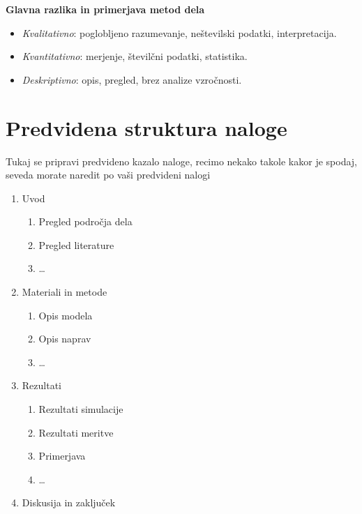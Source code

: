 \documentclass[pomnav,SMER=splošna]{fppdisp}
\begin{document}
\textbf{Glavna razlika in primerjava metod dela}
\begin{itemize}
	\item \textit{Kvalitativno}: poglobljeno razumevanje, neštevilski podatki, interpretacija.
	\item \textit{Kvantitativno}: merjenje, številčni podatki, statistika.
	\item \textit{Deskriptivno}: opis, pregled, brez analize vzročnosti.
\end{itemize}


\newpage
\section{Predvidena struktura naloge}

Tukaj se pripravi predvideno kazalo naloge, recimo nekako takole kakor je spodaj, seveda morate naredit po vaši predvideni nalogi

\begin{enumerate}
	\item Uvod
	\begin{enumerate}[label*=\arabic*.]
		\item Pregled področja dela
		\item Pregled literature
		\item \dots
	\end{enumerate}
	\item Materiali in metode
		\begin{enumerate}[label*=\arabic*.]
			\item Opis modela
			\item Opis naprav
			\item \dots
		\end{enumerate}
	\item Rezultati
		\begin{enumerate}[label*=\arabic*.]
			\item Rezultati simulacije
			\item Rezultati meritve
			\item Primerjava
			\item \dots
		\end{enumerate}
	\item Diskusija in zaključek
\end{enumerate}


\cleardoublepage
\singlespacing
{}
\printbibliography
\end{document}
